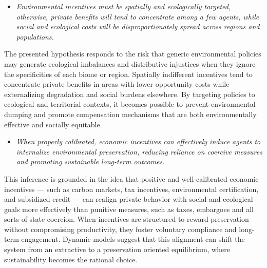 \begin{itemize}  

    \item[\textbf{H3.}] 
    
    \textit{Environmental incentives must be spatially and ecologically targeted, otherwise, private benefits will tend to concentrate among a few agents, while social and ecological costs will be disproportionately spread across regions and populations.}
\end{itemize}

The presented hypothesis responds to the risk that generic environmental policies may generate ecological imbalances and distributive injustices when they ignore the specificities of each biome or region. Spatially indifferent incentives tend to concentrate private benefits in areas with lower opportunity costs while externalizing degradation and social burdens elsewhere. By targeting policies to ecological and territorial contexts, it becomes possible to prevent environmental dumping and promote compensation mechanisms that are both environmentally effective and socially equitable.

\begin{itemize}  

    \item[\textbf{H4.}] 
    
    \textit{When properly calibrated, economic incentives can effectively induce agents to internalize environmental preservation, reducing reliance on coercive measures and promoting sustainable long-term outcomes.}
\end{itemize}

This inference is grounded in the idea that positive and well-calibrated economic incentives — such as carbon markets, tax incentives, environmental certification, and subsidized credit — can realign private behavior with social and ecological goals more effectively than punitive measures, such as taxes, embargoes and all sorts of state coercion. When incentives are structured to reward preservation without compromising productivity, they foster voluntary compliance and long-term engagement. Dynamic models suggest that this alignment can shift the system from an extractive to a preservation oriented equilibrium, where sustainability becomes the rational choice.

